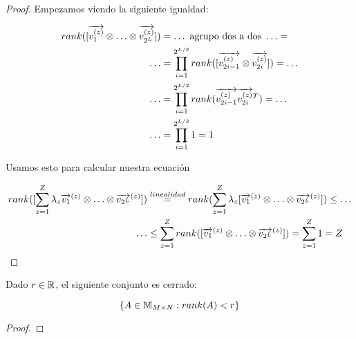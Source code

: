 \begin{proof}

    Empezamos viendo la siguiente igualdad:

    \begin{equation}
        \begin{split}
            rank([\nv{v_1^{(z)}}  \otimes \ldots \otimes \nv{v_{2^L}^{(z)}}]) &= \ldots \text{  agrupo dos a dos   } \ldots = \\
            \ldots &= \prod_{i = 1}^{2^{L/2}} rank([\nv{v_{2i - 1}^{(z)}} \otimes\nv{v_{2i}^{(z)}}]) = \ldots   \\
            \ldots &= \prod_{i = 1}^{2^{L/2}} rank(\nv{v_{2i - 1}^{(z)}} \nv{v_{2i}^{(z)}}^T) = \ldots \\
            \ldots &= \prod_{i = 1}^{2^{L/2}} 1 = 1
        \end{split}
    \end{equation}

    Usamos esto para calcular nuestra ecuación

    \begin{equation}
        \begin{split}
            rank([\sum_{z = 1}^Z \lambda_z \nv{v_1}^{(z)} \otimes \ldots \otimes \nv{v_{2^L}}^{(z)}]) &\encima{=}{linealidad} rank(\sum_{z = 1}^Z \lambda_z [\nv{v_1}^{(z)} \otimes \ldots \otimes \nv{v_{2^L}}^{(z)}]) \leq \ldots \\
            \ldots &\leq \sum_{z = 1}^Z rank([\nv{v_1}^{(z)} \otimes \ldots \otimes \nv{v_{2^L}}^{(z)}]) = \sum_{z = 1}^Z 1 = Z
        \end{split}
    \end{equation}
\end{proof}

\begin{proposicion}
    Dado $r \in \R$, el siguiente conjunto es cerrado:

    \begin{equation}
        \conjunto{A \in \espaciomatrices{M}{N}: rank(A) < r }
    \end{equation}
\end{proposicion}

\begin{proof}
\end{proof}



